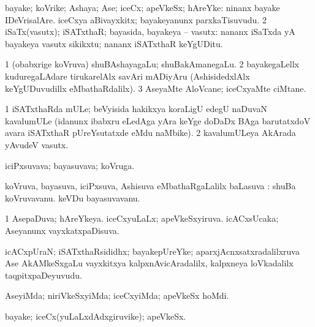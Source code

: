 {{{{{{\bentry
{} 
\gl{\nA}
\bmng
\bnum
{} 
\banum
{} bayake; koVrike; Ashaya; Ase; iceCx; apeVkeSx; hAreYke:  ninanx bayake IDeVrisalAre. 
 iceCxya aBivayxkitx; bayakeyanunx parxkaTisuvudu. 
\eanum
\numie
\num{2} iSaTx(vasutx); iSATxthaR; bayasida, bayakeya -- vasutx:  nananx iSaTxda yA bayakeya vasutx sikikxtu; nananx iSATxthaR keYgUDitu. 
\enum
\emng

\noindent 
\gl{\pagu}
\bmng
\bnum
\num{1}  (obabxrige koVruva) shuBAshayagaLu; shuBakAmanegaLu. 
\num{2}  bayakegaLellx kuduregaLAdare tirukarelAlx savAri mADiyAru (AshisidedxlAlx keYgUDuvudillx eMbathaRdalilx). 
\num{3}  AseyaMte AloVcane; iceCxyaMte ciMtane. 
\enum
\emng
\eentry

\bentry 
{}
  \gl{\nA}\bmng
\bnum
\num{1} iSATxthaRda mULe; beVyisida hakikxya koraLigU edegU naDuvaN kavalumULe (idanunx ibabxru eLedAga yAra keYge doDaDx BAga barutatxdoV avara iSATxthaR pUreYsutatxde eMdu naMbike). 
\num{2} kavalumULeya AkArada yAvudeV vasutx. 
\enum
\emng
\eentry

\bentry
{}
  \gl{\nA}\bmng
iciPxsuvava; bayasuvava; koVruga. 
\emng
\eentry

\bentry
{}
\gl{\sapUpa}
\bmng
koVruva, bayasuva, iciPxsuva, Ashisuva eMbathaRgaLalilx baLasuva \saupa:  shuBa koVruvavanu.  keVDu bayasuvavanu. 
\emng
\eentry

\bentry
{} 
\gl{\gu}
\expl{}
\bmng
\bnum
\num{1} AsepaDuva; hAreYkeya. 
\banum
{} iceCxyuLaLx; apeVkeSxyiruva. 
 icACxsUcaka; Aseyanunx vayxkatxpaDisuva. 
\eanum
\numie
\enum
\emng
\eentry

\bentry
{} 
\gl{\nA}
\bmng
icACxpUraN; iSATxthaRsididhx; bayakepUreYke; aparxjAcnxsatxradalilxruva Ase AkAMkeSxgaLu vayxkitxya kalpxnAvicAradalilx, kalpxneya loVkadalilx taqpitxpaDeyuvudu. 
\emng
\eentry

\bentry
{} 
\gl{\kirxvi}
\expl{}
\bmng
AseyiMda; niriVkeSxyiMda; iceCxyiMda; apeVkeSx hoMdi. 
\emng
\eentry

\bentry
{} 
\gl{\nA}
\expl{}
\bmng
bayake; iceCx(yuLaLxdAdxgiruvike); apeVkeSx. 
\emng
\eentry

}}}}}}
